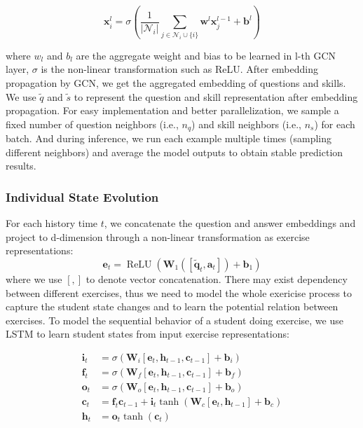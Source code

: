 \documentclass[11pt,en]{elegantpaper}
\begin{document}
$$\mathbf{x}_{i}^{l}=\sigma\left(\frac{1}{\left|\mathcal{N}_{i}\right|} \sum_{j \in \mathcal{N}_{i} \cup\{i\}} \mathbf{w}^{l} \mathbf{x}_{j}^{l-1}+\mathbf{b}^{l}\right) \label{1}$$

where $w_l$ and $b_l$ are the aggregate weight and bias to be learned in l-th GCN
layer, $\sigma$ is the non-linear transformation such as ReLU. After embedding propagation by GCN, we get the aggregated embedding of questions and skills. We use $\widetilde{q}$ and $\widetilde{s}$ to represent the question and skill representation after embedding propagation. For easy implementation and better parallelization, we sample a fixed number of question neighbors (i.e., $n_q$) and skill neighbors (i.e., $n_s$) for each batch. And during inference, we run each example multiple times (sampling different neighbors) and average the model outputs to obtain stable prediction results.

\subsubsection{Individual State Evolution}
For each history time $t$, we concatenate the question and answer embeddings and project to d-dimension through a non-linear transformation as exercise representations:
$$\mathbf{e}_{t}=\operatorname{ReLU}\left(\mathbf{W}_{1}\left(\left[\widetilde{\mathbf{q}}_{t}, \mathbf{a}_{t}\right]\right)+\mathbf{b}_{1}\right) \label{2}$$
where we use $[,]$ to denote vector concatenation. There may exist dependency between different exercises, thus we need to model the whole exericise process to capture the student state changes and to learn the potential relation between exercises. To model the sequential behavior of a student doing exercise, we use LSTM to learn student states from input exercise representations:

$$
\begin{aligned}
\mathbf{i}_{t} &=\sigma\left(\mathbf{W}_{i}\left[\mathbf{e}_{t}, \mathbf{h}_{t-1}, \mathbf{c}_{t-1}\right]+\mathbf{b}_{i}\right) \\
\mathbf{f}_{t} &=\sigma\left(\mathbf{W}_{f}\left[\mathbf{e}_{t}, \mathbf{h}_{t-1}, \mathbf{c}_{t-1}\right]+\mathbf{b}_{f}\right) \\
\mathbf{o}_{t} &=\sigma\left(\mathbf{W}_{o}\left[\mathbf{e}_{t}, \mathbf{h}_{t-1}, \mathbf{c}_{t-1}\right]+\mathbf{b}_{o}\right) \\
\mathbf{c}_{t} &=\mathbf{f}_{t} \mathbf{c}_{t-1}+\mathbf{i}_{t} \tanh \left(\mathbf{W}_{c}\left[\mathbf{e}_{t}, \mathbf{h}_{t-1}\right]+\mathbf{b}_{c}\right) \\
\mathbf{h}_{t} &=\mathbf{o}_{t} \tanh \left(\mathbf{c}_{t}\right)
\end{aligned}
$$
\end{document}

